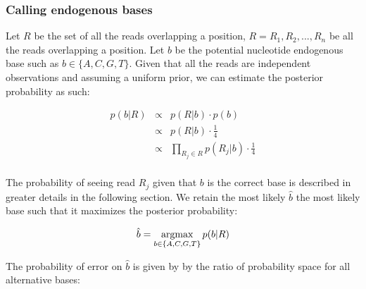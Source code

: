 \documentclass[a4paper,12pt]{article}
\newcommand{\argmax}{\operatornamewithlimits{argmax}}
\begin{document}
\begin{itemize}
\begin{itemize}





































\subsubsection{Calling endogenous bases}
\label{sec:callingendobase}

\noindent Let $R$ be the set of all the reads overlapping a position, $R={R_1,R_2,...,R_n}$ be all the reads overlapping a position.  Let $b$ be the potential nucleotide endogenous base such as $b\in\{A,C,G,T\}$. Given that all the reads are independent observations and assuming a uniform prior, we can estimate the posterior probability as such:

\begin{eqnarray}
  p(b|R)   & \propto & p(R|b) \cdot p(b)  \\
  & \propto & p(R|b) \cdot \frac {1} {4} \\
  & \propto & \prod_{R_j \in R} p(R_j|b) \cdot \frac {1} {4} \\
\label{eqn:idenp}
\end{eqnarray} 


\noindent The probability of seeing read $R_j$ given that $b$ is the correct base is described in greater details in the following section.  We retain the most likely $\hat{b}$ the most likely base such that it maximizes the posterior probability:

\begin{equation}
\hat{b} = \argmax_{b \in \{A,C,G,T\} }   p(b|R)
\end{equation} 


\noindent  The probability of error on $\hat{b}$ is given by by the ratio of probability space for all alternative bases:


\end{itemize}
\end{itemize}
\end{document}
